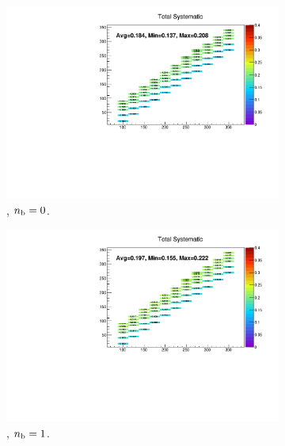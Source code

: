 \begin{figure}[h!]
  \centering
  \begin{subfigure}[b]{0.47\textwidth}
    \includegraphics[width=\textwidth]{Figs/sms/t2cc/v37/systs_v2/total_T2cc_eq0b_le3j_incl.pdf}
    \caption{\njlow, $n_{\text{b}} = 0$.}
  \end{subfigure}
  \begin{subfigure}[b]{0.47\textwidth}
    \includegraphics[width=\textwidth]{Figs/sms/t2cc/v37/systs_v2/total_T2cc_eq1b_le3j_incl.pdf}
    \caption{\njlow, $n_{\text{b}} = 1$.}
  \end{subfigure}\\
  \begin{subfigure}[b]{0.47\textwidth}

\end{subfigure}
\end{figure}

